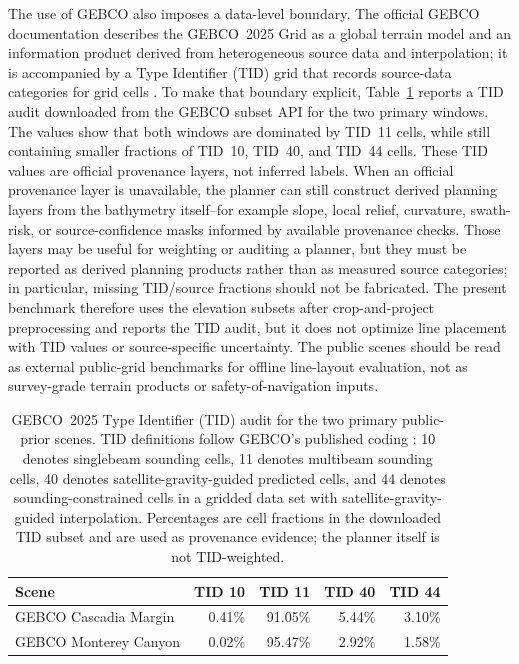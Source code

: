 \documentclass[jmse,article,submit,moreauthors]{Definitions/mdpi}
\begin{document}
The use of GEBCO also imposes a data-level boundary. The official GEBCO documentation describes the GEBCO~2025 Grid as a global terrain model and an information product derived from heterogeneous source data and interpolation; it is accompanied by a Type Identifier (TID) grid that records source-data categories for grid cells \cite{gebco2025grid}. To make that boundary explicit, Table~\ref{tab:gebco_tid_audit} reports a TID audit downloaded from the GEBCO subset API for the two primary windows. The values show that both windows are dominated by TID~11 cells, while still containing smaller fractions of TID~10, TID~40, and TID~44 cells. These TID values are official provenance layers, not inferred labels. When an official provenance layer is unavailable, the planner can still construct derived planning layers from the bathymetry itself--for example slope, local relief, curvature, swath-risk, or source-confidence masks informed by available provenance checks. Those layers may be useful for weighting or auditing a planner, but they must be reported as derived planning products rather than as measured source categories; in particular, missing TID/source fractions should not be fabricated. The present benchmark therefore uses the elevation subsets after crop-and-project preprocessing and reports the TID audit, but it does not optimize line placement with TID values or source-specific uncertainty. The public scenes should be read as external public-grid benchmarks for offline line-layout evaluation, not as survey-grade terrain products or safety-of-navigation inputs.

\begin{table}[!htbp]
	\centering
	\caption{GEBCO~2025 Type Identifier (TID) audit for the two primary public-prior scenes. TID definitions follow GEBCO's published coding \cite{gebco_tid_grid}: 10 denotes singlebeam sounding cells, 11 denotes multibeam sounding cells, 40 denotes satellite-gravity-guided predicted cells, and 44 denotes sounding-constrained cells in a gridded data set with satellite-gravity-guided interpolation. Percentages are cell fractions in the downloaded TID subset and are used as provenance evidence; the planner itself is not TID-weighted.}
	\label{tab:gebco_tid_audit}
	\scriptsize
	\renewcommand{\arraystretch}{1.10}
	\setlength{\tabcolsep}{4.2pt}
	\begin{tabular}{@{}lrrrr@{}}
		\toprule[1bp]
		\textbf{Scene} & \textbf{TID 10} & \textbf{TID 11} & \textbf{TID 40} & \textbf{TID 44} \\
		\midrule[1bp]
		GEBCO Cascadia Margin & 0.41\% & 91.05\% & 5.44\% & 3.10\% \\
		GEBCO Monterey Canyon & 0.02\% & 95.47\% & 2.92\% & 1.58\% \\
		\bottomrule[1bp]
	\end{tabular}
\end{table}
\end{document}
